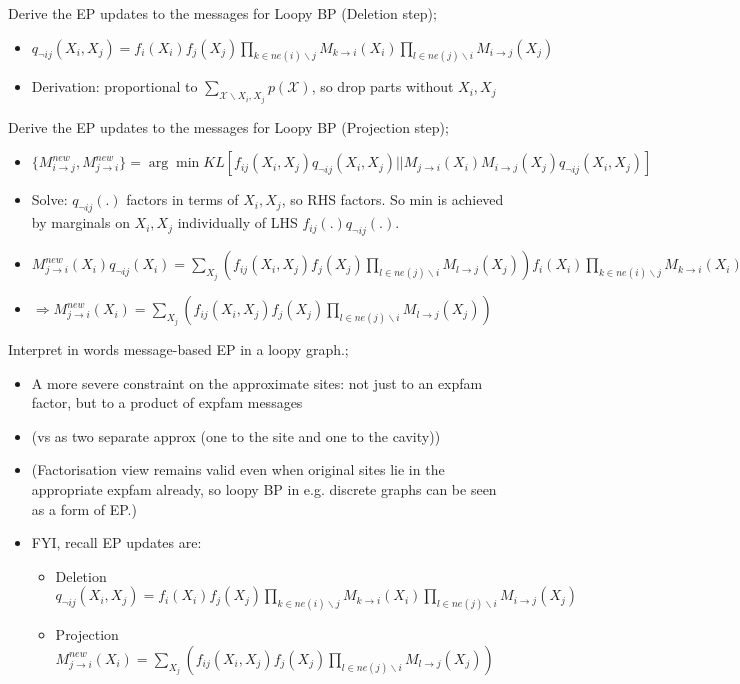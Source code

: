 \documentclass{article}
\begin{document}
Derive the EP updates to the messages for Loopy BP (Deletion step); \begin{itemize} \item $q_{\neg ij}(X_i, X_j) = f_i(X_i)f_j(X_j)\prod_{k\in ne(i)\backslash j}M_{k\rightarrow i}(X_i)\prod_{l\in ne(j)\backslash i}M_{i\rightarrow j}(X_j)$ \item Derivation: proportional to $\sum_{\mathcal{X}\backslash X_i, X_j}p(\mathcal{X})$, so drop parts without $X_i, X_j$ \end{itemize} 

Derive the EP updates to the messages for Loopy BP (Projection step); \begin{itemize} \item $\{M^{new}_{i\rightarrow j}, M^{new}_{j \rightarrow i}\} = \arg\min KL[f_{ij}(X_i, X_j)q_{\neg ij}(X_i, X_j) || M_{j\rightarrow i}(X_i) M_{i\rightarrow j}(X_j)q_{\neg ij}(X_i, X_j)] $ \item Solve: $q_{\neg ij}(.)$ factors in terms of $X_i, X_j$, so RHS factors. So min is achieved by marginals on $X_i, X_j$ individually of LHS $f_{ij}(.)q_{\neg ij}(.)$. \item $M_{j\rightarrow i}^{new}(X_i)q_{\neg ij}(X_i) = \sum_{X_j}(f_{ij}(X_i, X_j)f_j(X_j)\prod_{l\in ne(j)\backslash i}M_{l\rightarrow j}(X_j)) f_i(X_i) \prod_{k\in ne(i) \backslash j}M_{k\rightarrow i}(X_i)$  \item $\Rightarrow M_{j\rightarrow i}^{new}(X_i) = \sum_{X_j}(f_{ij}(X_i, X_j)f_j(X_j)\prod_{l\in ne(j)\backslash i}M_{l\rightarrow j}(X_j))$ \end{itemize}

Interpret in words message-based EP in a loopy graph.; \begin{itemize} \item A more severe constraint on the approximate sites: not just to an expfam factor, but to a product of expfam messages \item (vs as two separate approx (one to the site and one to the cavity)) \item (Factorisation view remains valid even when original sites lie in the appropriate expfam already, so loopy BP in e.g. discrete graphs can be seen as a form of EP.) \item FYI, recall EP updates are: \begin{itemize} \item Deletion $q_{\neg ij}(X_i, X_j) = f_i(X_i)f_j(X_j)\prod_{k\in ne(i)\backslash j}M_{k\rightarrow i}(X_i)\prod_{l\in ne(j)\backslash i}M_{i\rightarrow j}(X_j)$ \item Projection $M_{j\rightarrow i}^{new}(X_i) = \sum_{X_j}(f_{ij}(X_i, X_j)f_j(X_j)\prod_{l\in ne(j)\backslash i}M_{l\rightarrow j}(X_j))$ \end{itemize} \end{itemize}
\end{document}
